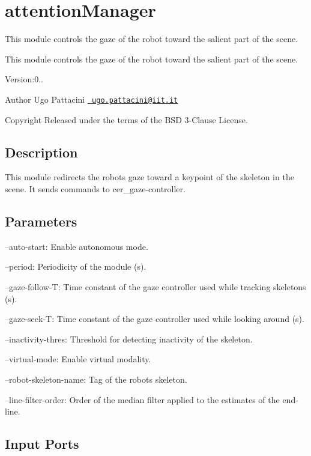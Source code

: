 \section{attention\+Manager}
\label{group__attentionManager}


This module controls the gaze of the robot toward the salient part of the scene.  


This module controls the gaze of the robot toward the salient part of the scene. 

Version\+:0.. \begin{DoxyAuthor}{Author}
Ugo Pattacini \href{mailto:ugo.pattacini@iit.it}{\texttt{ ugo.\+pattacini@iit.\+it}} ~\newline
 
\end{DoxyAuthor}
\begin{DoxyCopyright}{Copyright}
Released under the terms of the B\+SD 3-\/Clause License. 
\end{DoxyCopyright}
\hypertarget{group__skeletonViewer_intro_sec}{}\subsection{Description}\label{group__skeletonViewer_intro_sec}
This module redirects the robot\textquotesingle{}s gaze toward a keypoint of the skeleton in the scene. It sends commands to cer\+\_\+gaze-\/controller.\hypertarget{group__skeletonViewer_parameters_sec}{}\subsection{Parameters}\label{group__skeletonViewer_parameters_sec}

\begin{DoxyItemize}
\item --auto-\/start\+: Enable autonomous mode.
\item --period\+: Periodicity of the module (s).
\item --gaze-\/follow-\/T\+: Time constant of the gaze controller used while tracking skeletons (s).
\item --gaze-\/seek-\/T\+: Time constant of the gaze controller used while looking around (s).
\item --inactivity-\/thres\+: Threshold for detecting inactivity of the skeleton.
\item --virtual-\/mode\+: Enable virtual modality.
\item --robot-\/skeleton-\/name\+: Tag of the robot\textquotesingle{}s skeleton.
\item --line-\/filter-\/order\+: Order of the median filter applied to the estimates of the end-\/line. 
\end{DoxyItemize}\hypertarget{group__skeletonViewer_inputports_sec}{}\subsection{Input Ports}\label{group__skeletonViewer_inputports_sec}

